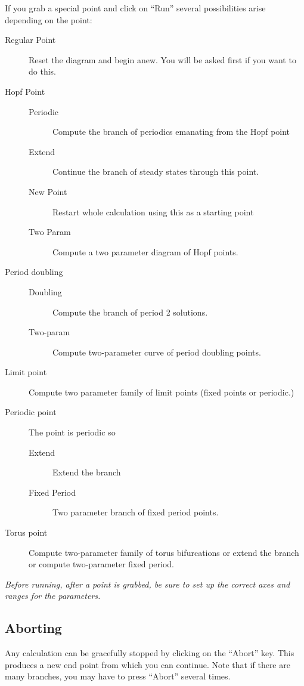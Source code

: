 \documentclass{article}
\begin{document}
If you grab a special point and click on ``Run'' several possibilities
arise depending on the point:
\begin{description}
\item[Regular Point] Reset the diagram and begin anew.  You will be
asked first if you want to do this.
\item[Hopf Point]
\begin{description}
	\item[Periodic] Compute the branch of periodics emanating from
the Hopf point
	\item[Extend] Continue the branch of steady states through
this point.
	\item[New Point] Restart whole calculation using this as a
starting point
	\item[Two Param] Compute a two parameter diagram of Hopf
points.
	\end{description}
\item[Period doubling]
	\begin{description}
	\item[Doubling] Compute the branch of period 2 solutions.
	\item[Two-param]  Compute two-parameter curve of period
doubling points.
	\end{description}

\item[Limit point] Compute two parameter family of limit points (fixed
points or periodic.)
\item[Periodic point] The point is periodic so
	\begin{description}
	\item[Extend] Extend the branch
	\item[Fixed Period] Two parameter branch of fixed period
points.
	\end{description}

\item[Torus point]  Compute two-parameter family of torus
bifurcations or extend the branch or compute two-parameter
fixed period.

\end{description}

{\em Before running, after a point is grabbed, be sure to set up the
correct axes and ranges for the parameters.}

\subsection{Aborting}
Any calculation can be gracefully stopped by clicking on the ``Abort''
key. This produces a new end point from which you can continue.  Note
that if there are many branches, you may have to press ``Abort''
several times.
\end{document}
